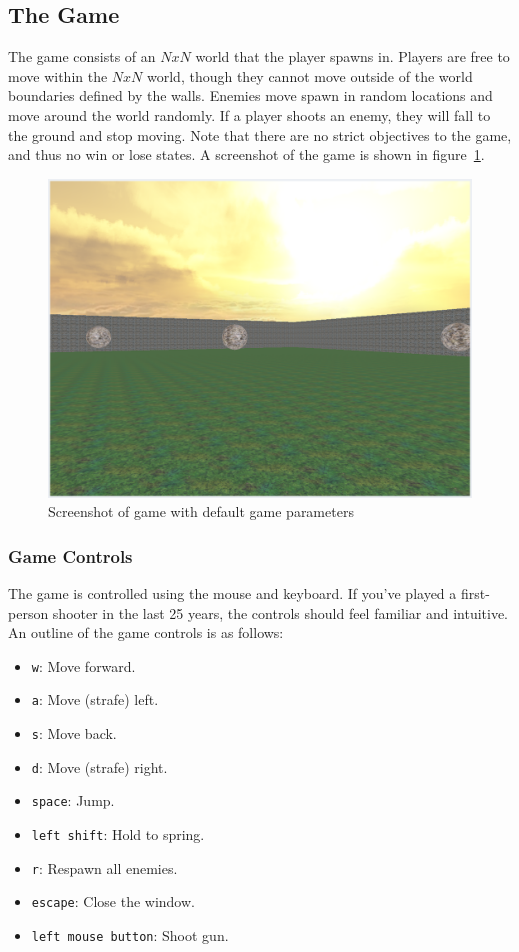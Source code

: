 \documentclass {article}
\begin{document}
\subsection{The Game}\label{sec:game}
The game consists of an $N x N$ world that the player spawns in. Players are free to move within the $N x N$ world, though they cannot move outside of the world boundaries defined by the walls. Enemies move spawn in random locations and move around the world randomly. If a player shoots an enemy, they will fall to the ground and stop moving. Note that there are no strict objectives to the game, and thus no win or lose states. A screenshot of the game is shown in figure~\ref{fig:game}.
\begin{figure}[H]
  \begin{center}
  \includegraphics[width=\textwidth]{game.png}
  \end{center}\caption{Screenshot of game with default game parameters}\label{fig:game}
\end{figure}

\subsubsection{Game Controls}\label{sec:controls}
The game is controlled using the mouse and keyboard. If you've played a first-person shooter in the last 25 years, the controls should feel familiar and intuitive. An outline of the game controls is as follows:
\begin{itemize}
  \item \texttt{w}: Move forward.
  \item \texttt{a}: Move (strafe) left.
  \item \texttt{s}: Move back.
  \item \texttt{d}: Move (strafe) right.
  \item \texttt{space}: Jump.
  \item \texttt{left shift}: Hold to spring.
  \item \texttt{r}: Respawn all enemies.
  \item \texttt{escape}: Close the window.
  \item \texttt{left mouse button}: Shoot gun.
\end{itemize}
\end{document}
